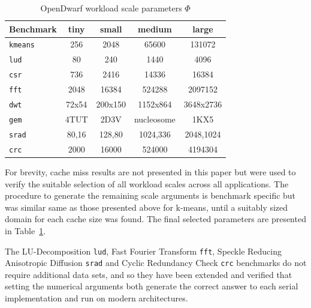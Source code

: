 \documentclass[../document.tex]{subfiles}
\begin{document}

\begin{table}[t]
\centering
\begin{threeparttable}
    \centering
    \caption{OpenDwarf workload scale parameters $\Phi$}
    \begin{tabular}{l|c|c|c|c}
        \bf Benchmark         & \bf tiny   & small  & medium     & large\\\hline
        {\tt kmeans}          & 256        & 2048   & 65600      & 131072\\
        {\tt lud}             & 80         & 240    & 1440       & 4096\\
        {\tt csr}             & 736        & 2416   & 14336      & 16384\\
        {\tt fft}             & 2048       & 16384  & 524288     & 2097152\\
        {\tt dwt}             & 72x54      & 200x150& 1152x864   & 3648x2736\\       
        {\tt gem}             & 4TUT       & 2D3V   & nucleosome & 1KX5\\
        {\tt srad}            & 80,16      & 128,80 & 1024,336   & 2048,1024\\
        {\tt crc}             & 2000       & 16000  & 524000     & 4194304\\
    \end{tabular}
    \label{tab:problem_sizes}
\end{threeparttable}
\end{table}

For brevity, cache miss results are not presented in this paper but were used to verify the suitable selection of all workload scales across all applications.
The procedure to generate the remaining scale arguments is benchmark specific but was similar same as those presented above for k-means, until a suitably sized domain for each cache size was found.
The final selected parameters are presented in Table~\ref{tab:problem_sizes}.

The LU-Decomposition {\tt lud}, Fast Fourier Transform {\tt fft}, Speckle Reducing Anisotropic Diffusion {\tt srad} and Cyclic Redundancy Check {\tt crc} benchmarks do not require additional data sets, and so they have been extended and verified that setting the numerical arguments both generate the correct answer to each serial implementation and run on modern architectures.
\end{document}
